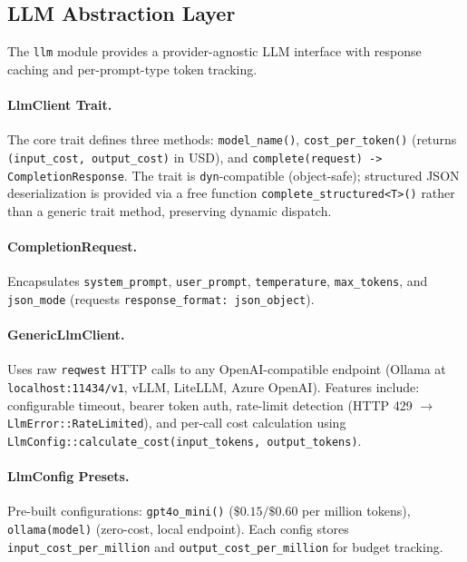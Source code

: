 \documentclass[11pt,a4paper,twocolumn]{article}
\begin{document}
\subsection{LLM Abstraction Layer}
\label{sec:llm}

The \texttt{llm} module provides a provider-agnostic LLM interface
with response caching and per-prompt-type token tracking.

\paragraph{LlmClient Trait.}
The core trait defines three methods: \texttt{model\_name()},
\texttt{cost\_per\_token()} (returns \texttt{(input\_cost, output\_cost)}
in USD), and \texttt{complete(request) -> CompletionResponse}.
The trait is \texttt{dyn}-compatible (object-safe); structured
JSON deserialization is provided via a free function
\texttt{complete\_structured<T>()} rather than a generic trait method,
preserving dynamic dispatch.

\paragraph{CompletionRequest.}
Encapsulates \texttt{system\_prompt}, \texttt{user\_prompt},
\texttt{temperature}, \texttt{max\_tokens}, and \texttt{json\_mode}
(requests \texttt{response\_format: json\_object}).

\paragraph{GenericLlmClient.}
Uses raw \texttt{reqwest} HTTP calls to any OpenAI-compatible
endpoint (Ollama at \texttt{localhost:11434/v1}, vLLM, LiteLLM,
Azure OpenAI). Features include: configurable timeout, bearer
token auth, rate-limit detection (HTTP 429 $\to$
\texttt{LlmError::RateLimited}), and per-call cost calculation
using \texttt{LlmConfig::calculate\_cost(input\_tokens,
output\_tokens)}.

\paragraph{LlmConfig Presets.}
Pre-built configurations: \texttt{gpt4o\_mini()} ($\$0.15/\$0.60$
per million tokens), \texttt{ollama(model)} (zero-cost, local
endpoint). Each config stores \texttt{input\_cost\_per\_million}
and \texttt{output\_cost\_per\_million} for budget tracking.
\end{document}
